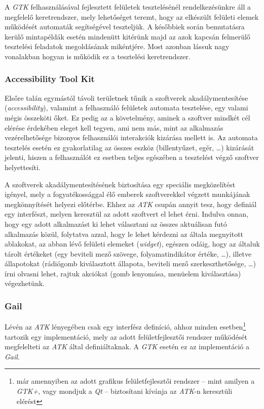 A \textit{GTK} felhasználásával fejlesztett felületek tesztelésénél rendelkezésünkre áll a megfelelő keretrendszer, mely lehetőséget teremt, hogy az elkészült felületi elemek működését automaták segítségével teszteljük. A későbbiek során bemutatásra kerülő mintapéldák esetén mindenütt kitérünk majd az azok kapcsán felmerülő tesztelési feladatok megoldásának mikéntjére. Most azonban lássuk nagy vonalakban hogyan is működik ez a tesztelési keretrendszer.

\subsubsection{Accessibility Tool Kit}
\label{sec:atk}

Elsőre talán egymástól távoli területnek tűnik a szoftverek akadálymentesítése (\textit{accessibility}), valamint a felhasználó felületek automata tesztelése, egy valami mégis összeköti őket. Ez pedig az a követelmény, aminek a szoftver mindkét cél elérése érdekében eleget kell tegyen, ami nem más, mint az alkalmazás vezérelhetősége bizonyos felhasználói interakciók kizárása mellett is. Az automata tesztelés esetén ez gyakorlatilag az összes eszköz (billentyűzet, egér, \dots) kizárását jelenti, hiszen a felhasználót ez esetben teljes egészében a tesztelést végző szoftver helyettesíti.

A szoftverek akadálymentesítésének biztosítása egy speciális megközelítést igényel, mely a fogyatékossággal élő emberek szoftverekkel végzett munkájának megkönnyítését helyezi előtérbe. Ehhez az \textit{ATK} csupán annyit tesz, hogy definiál egy interfészt, melyen keresztül az adott szoftvert el lehet érni. Indulva onnan, hogy egy adott alkalmazást ki lehet választani az összes aktuálisan futó alkalmazás közül, folytatva azzal, hogy le lehet kérdezni az általa megnyitott ablakokat, az abban lévő felületi elemeket (\textit{widget}), egészen odáig, hogy az általuk tárolt értékeket (egy beviteli mező szövege, folyamatindikátor értéke, \dots), illetve állapotokat (rádiógomb kiválasztott állapota, beviteli mező szerkeszthetősége, \dots) írni olvasni lehet, rajtuk akciókat (gomb lenyomása, menüelem kiválasztása) végezhetünk.

\subsubsection{Gail}
\label{sec:gail}

Lévén az \textit{ATK} lényegében csak egy interfész definíció, ahhoz minden esetben\footnote{már amennyiben az adott grafikus felületfejlesztői rendszer -- mint amilyen a \textit{GTK+}, vagy mondjuk a \textit{Qt} -- biztosítani kívánja az \textit{ATK}-n keresztüli elérést} tartozik egy implementáció, mely az adott felületfejlesztői rendszer működését megfelelteti az \textit{ATK} által definiáltaknak. A \textit{GTK}  esetén ez az implementáció a \textit{Gail}.

